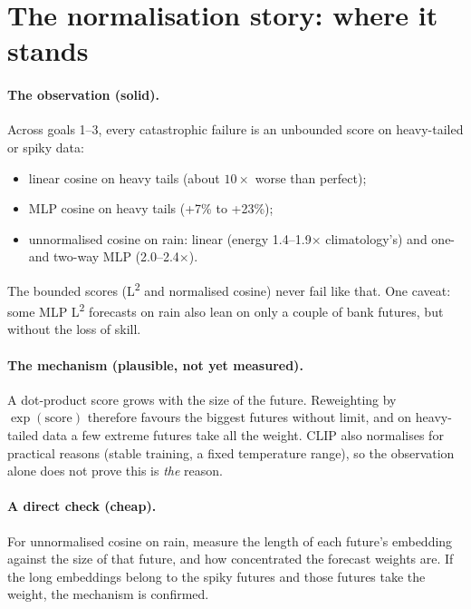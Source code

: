 \documentclass[11pt]{article}
\newcommand{\Ltwo}{L\textsuperscript{2}}
\begin{document}
\section{The normalisation story: where it stands}

\paragraph{The observation (solid).} Across goals 1--3, every catastrophic failure is an
unbounded score on heavy-tailed or spiky data:
\begin{itemize}
\item linear cosine on heavy tails (about $10\times$ worse than perfect);
\item MLP cosine on heavy tails (+7\% to +23\%);
\item unnormalised cosine on rain: linear (energy 1.4--1.9$\times$ climatology's) and
  one- and two-way MLP (2.0--2.4$\times$).
\end{itemize}
The bounded scores (\Ltwo{} and normalised cosine) never fail like that. One caveat: some
MLP \Ltwo{} forecasts on rain also lean on only a couple of bank futures, but without the
loss of skill.

\paragraph{The mechanism (plausible, not yet measured).} A dot-product score grows with the
size of the future. Reweighting by $\exp(\text{score})$ therefore favours the biggest
futures without limit, and on heavy-tailed data a few extreme futures take all the weight.
CLIP also normalises for practical reasons (stable training, a fixed temperature range), so
the observation alone does not prove this is \emph{the} reason.

\paragraph{A direct check (cheap).} For unnormalised cosine on rain, measure the length of
each future's embedding against the size of that future, and how concentrated the forecast
weights are. If the long embeddings belong to the spiky futures and those futures take the
weight, the mechanism is confirmed.
\end{document}
